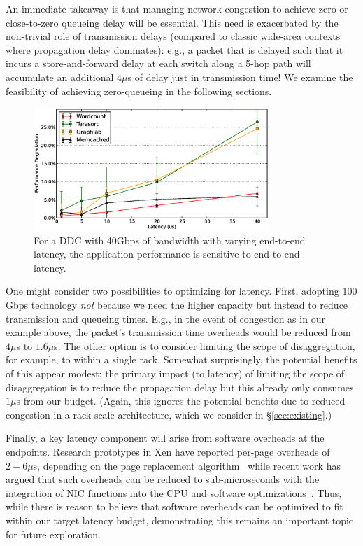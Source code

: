 {An immediate takeaway is that managing network congestion to achieve zero or close-to-zero queueing delay will be essential. This need is exacerbated by the 
non-trivial role of transmission delays (compared to classic wide-area contexts where propagation delay dominates): e.g., a packet that is delayed such that it incurs a store-and-forward delay at each switch along a 5-hop path will accumulate an additional $4\mu$s of delay just in transmission time! We examine the feasibility of achieving zero-queueing in the following sections. 

%
\begin{figure}
  \centering
    \includegraphics[width = 3.5in]{img/fix_bw_vary_latency.eps} 
  \caption{\small{For a DDC with 40Gbps of bandwidth with varying end-to-end latency, the application performance is sensitive to end-to-end latency.}}
  \label{fig:impl}
\end{figure}
%

One might consider two possibilities to optimizing for latency. First, adopting $100$Gbps technology \emph{not} because we need the higher capacity but instead to reduce transmission and queueing times. E.g., in the event of congestion as in our example above, the packet's transmission time overheads would be reduced from $4\mu$s to $1.6\mu$s. 
The other option is to consider limiting the scope of disaggregation, for example, to within a single rack. Somewhat surprisingly, the potential benefits of this appear modest: the primary impact (to latency) of limiting the scope of disaggregation is to reduce the propagation delay but this already only consumes $1\mu$s from our budget.
(Again, this ignores the potential benefits due to reduced congestion in a rack-scale architecture, which we consider in \S\ref{sec:existing}.)

Finally, a key latency component will arise from software overheads 
at the endpoints. Research prototypes in Xen have reported per-page overheads of $2-6\mu$s, depending on the page replacement algorithm~\cite{ddcHwDesign1} while recent work has argued that such overheads can be reduced to sub-microseconds with the integration of NIC functions into the CPU and software optimizations~\cite{lowlatency}. Thus, while there is reason to believe that software overheads can be optimized to fit within our target latency budget, demonstrating this remains an important topic for future exploration.

}
